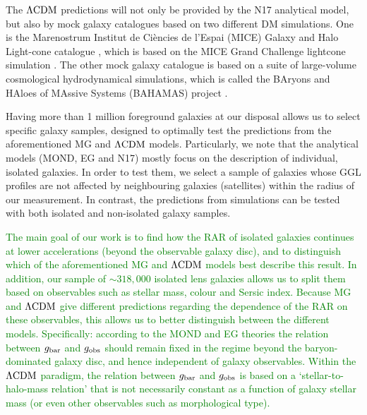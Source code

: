 \documentclass[usenatbib]{mnras}
\newcommand{\lcdm}{{\rm \Lambda CDM}}
\newcommand{\un}[1]{_{\rm #1}}
\begin{document}
The $\lcdm$ predictions will not only be provided by the N17 analytical model, but also by mock galaxy catalogues based on two different DM simulations. One is the Marenostrum Institut de Ci{\`e}ncies de l'Espai (MICE) Galaxy and Halo Light-cone catalogue \cite[]{carretero2015,hoffmann2015}, which is based on the MICE Grand Challenge lightcone simulation \cite[MICE-GC,][]{fosalba2015a,fosalba2015b,crocce2015}. The other mock galaxy catalogue is based on a suite of large-volume cosmological hydrodynamical simulations, which is called the BAryons and HAloes of MAssive Systems (BAHAMAS) project \cite[]{mccarthy2017}.

Having more than 1 million foreground galaxies at our disposal allows us to select specific galaxy samples, designed to optimally test the predictions from the aforementioned MG and $\lcdm$ models. Particularly, we note that the analytical models (MOND, EG and N17) mostly focus on the description of individual, isolated galaxies. In order to test them, we select a sample of galaxies whose GGL profiles are not affected by neighbouring galaxies (satellites) within the radius of our measurement. In contrast, the predictions from simulations can be tested with both isolated and non-isolated galaxy samples.

\textcolor{Green}{The main goal of our work is to find how the RAR of isolated galaxies continues at lower accelerations (beyond the observable galaxy disc), and to distinguish which of the aforementioned MG and $\lcdm$ models best describe this result. In addition, our sample of $\sim318,000$ isolated lens galaxies allows us to split them based on observables such as stellar mass, colour and Sersic index. Because MG and $\lcdm$ give different predictions regarding the dependence of the RAR on these observables, this allows us to better distinguish between the different models. Specifically: according to the MOND and EG theories the relation between $g\un{bar}$ and $g\un{obs}$ should remain fixed in the regime beyond the baryon-dominated galaxy disc, and hence independent of galaxy observables. Within the $\lcdm$ paradigm, the relation between $g\un{bar}$ and $g\un{obs}$ is based on a `stellar-to-halo-mass relation' that is not necessarily constant as a function of galaxy stellar mass (or even other observables such as morphological type).}
\end{document}
